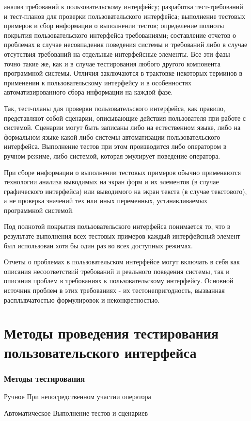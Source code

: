 \documentclass{../industrial-development}
\begin{document}
анализ требований к пользовательскому интерфейсу;
разработка тест-требований и тест-планов для проверки пользовательского интерфейса;
выполнение тестовых примеров и сбор информации о выполнении тестов;
определение полноты покрытия пользовательского интерфейса требованиями;
составление отчетов о проблемах в случае несовпадения поведения системы и требований либо в случае отсутствия требований на отдельные интерфейсные элементы.
Все эти фазы точно такие же, как и в случае тестирования любого другого компонента программной системы. Отличия заключаются в трактовке некоторых терминов в применении к пользовательскому интерфейсу и в особенностях автоматизированного сбора информации на каждой фазе.

Так, тест-планы для проверки пользовательского интерфейса, как правило, представляют собой сценарии, описывающие действия пользователя при работе с системой. Сценарии могут быть записаны либо на естественном языке, либо на формальном языке какой-либо системы автоматизации пользовательского интерфейса. Выполнение тестов при этом производится либо оператором в ручном режиме, либо системой, которая эмулирует поведение оператора.

При сборе информации о выполнении тестовых примеров обычно применяются технологии анализа выводимых на экран форм и их элементов (в случае графического интерфейса) или выводимого на экран текста (в случае текстового), а не проверка значений тех или иных переменных, устанавливаемых программной системой.

Под полнотой покрытия пользовательского интерфейса понимается то, что в результате выполнения всех тестовых примеров каждый интерфейсный элемент был использован хотя бы один раз во всех доступных режимах.

Отчеты о проблемах в пользовательском интерфейсе могут включать в себя как описания несоответствий требований и реального поведения системы, так и описания проблем в требованиях к пользовательскому интерфейсу. Основной источник проблем в этих требованиях - их тестонепригодность, вызванная расплывчатостью формулировок и неконкретностью.

\section{Методы проведения тестирования пользовательского интерфейса}

\begin{frame} \frametitle{Методы тестирования}
  \begin{block}{Ручное}
   При непосредственном участии оператора
  \end{block}
  \begin{block}{Автоматическое}
   Выполнение тестов и сценариев
  \end{block}
\end{frame}
\end{document}
